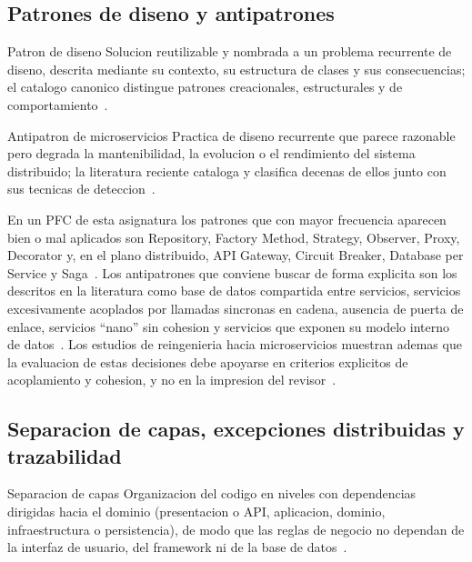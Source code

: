 \documentclass[11pt,a4paper]{article}
\begin{document}
\subsection{Patrones de diseno y antipatrones}

\begin{defBox}{Patron de diseno}
    Solucion reutilizable y nombrada a un problema recurrente de diseno, descrita mediante su contexto, su estructura de clases y sus consecuencias; el catalogo canonico distingue patrones creacionales, estructurales y de comportamiento~\cite{Gamma1994DesignPatterns}.
\end{defBox}

\begin{defBox}{Antipatron de microservicios}
    Practica de diseno recurrente que parece razonable pero degrada la mantenibilidad, la evolucion o el rendimiento del sistema distribuido; la literatura reciente cataloga y clasifica decenas de ellos junto con sus tecnicas de deteccion~\cite{Cerny2023TertiaryStudy,Tighilt2023MicroserviceAntipatterns}.
\end{defBox}

En un PFC de esta asignatura los patrones que con mayor frecuencia aparecen bien o mal aplicados son Repository, Factory Method, Strategy, Observer, Proxy, Decorator y, en el plano distribuido, API Gateway, Circuit Breaker, Database per Service y Saga~\cite{Richardson2018Patterns,Newman2021Microservices}.
Los antipatrones que conviene buscar de forma explicita son los descritos en la literatura como base de datos compartida entre servicios, servicios excesivamente acoplados por llamadas sincronas en cadena, ausencia de puerta de enlace, servicios ``nano'' sin cohesion y servicios que exponen su modelo interno de datos~\cite{TaibiLenarduzzi2018BadSmells,Cerny2023TertiaryStudy}.
Los estudios de reingenieria hacia microservicios muestran ademas que la evaluacion de estas decisiones debe apoyarse en criterios explicitos de acoplamiento y cohesion, y no en la impresion del revisor~\cite{Mohottige2025Reengineering}.

\subsection{Separacion de capas, excepciones distribuidas y trazabilidad}

\begin{defBox}{Separacion de capas}
    Organizacion del codigo en niveles con dependencias dirigidas hacia el dominio (presentacion o API, aplicacion, dominio, infraestructura o persistencia), de modo que las reglas de negocio no dependan de la interfaz de usuario, del framework ni de la base de datos~\cite{Martin2017CleanArchitecture}.
\end{defBox}
\end{document}
